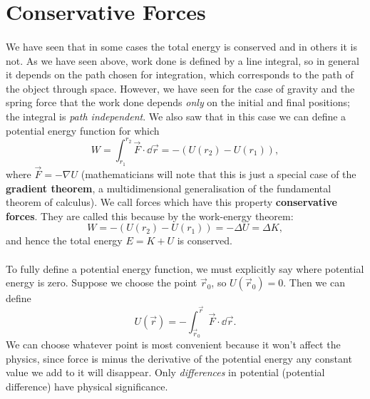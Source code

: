 \documentclass[../classical_mechanics.tex]{subfiles}
\begin{document}
    \section{Conservative Forces}
        \paragraph{}
        We have seen that in some cases the total energy is conserved and in others it is not.
        As we have seen above, work done is defined by a line integral, so in general it depends on the path chosen for integration, which corresponds to the path of the object through space.
        However, we have seen for the case of gravity and the spring force that the work done depends \textit{only} on the initial and final positions; the integral is \textit{path independent}.
        We also saw that in this case we can define a potential energy function for which
        \begin{equation}
            W=\int_{r_1}^{r_2}\vec{F}\cdot\dd{\vec{r}}=-(U(r_2)-U(r_1)),
        \end{equation}
        where $\vec{F}=-\nabla U$ (mathematicians will note that this is just a special case of the \textbf{gradient theorem}, a multidimensional generalisation of the fundamental theorem of calculus).
        We call forces which have this property \textbf{conservative forces}.
        They are called this because by the work-energy theorem:
        \begin{equation}
            W=-(U(r_2)-U(r_1))=-\Delta U=\Delta K,
        \end{equation}
        and hence the total energy $E=K+U$ is conserved.

        \paragraph{}
        To fully define a potential energy function, we must explicitly say where potential energy is zero.
        Suppose we choose the point $\vec{r}_0$, so $U(\vec{r}_0)=0$.
        Then we can define
        \begin{equation}
            U(\vec{r})=-\int_{\vec{r}_0}^{\vec{r}}\vec{F}\cdot\dd{\vec{r}}.
        \end{equation}
        We can choose whatever point is most convenient because it won't affect the physics, since force is minus the derivative of the potential energy any constant value we add to it will disappear.
        Only \textit{differences} in potential (potential difference) have physical significance.
\end{document}
